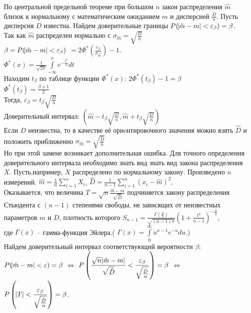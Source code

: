 \documentclass[russian, 12pt, fleqn,x11names]{article}
\begin{document}
По центральной предельной теореме при большом $n$ закон распределения $\hat{m}$ близок к нормальному с математическим ожиданием $m$ и дисперсией $\frac{D}{n}$. Пусть дисперсия $D$ известна. Найдем доверительные границы $P(\abs{\hat{m} - m} < \varepsilon_\beta) = \beta$. 
Так как $\hat{m}$ распределен нормально с $\sigma_{\hat{m}} = \sqrt{\frac{D}{n}}$\\
$\beta = P(\abs{\hat{m} - m} < \varepsilon_\beta)$
$ = 2\Phi^*(\frac{\varepsilon_\beta}{\sigma_{\hat{m}}}) - 1$.\\
$\Phi^*(x) = \frac{1}{\sqrt{2\pi}} \displaystyle{\int \limits _{-\infty} ^ {x}} e^{-\frac{t^2}{2}} dt$\\
Находим $t_\beta$ по таблице функции $\Phi^*(x)$: $2\Phi^*(t_\beta) - 1 = \beta$\\
$\Phi^*(t_\beta) = \frac{\beta + 1}{2}$\\
Тогда, $\varepsilon_\beta = t_{\beta} \sqrt{\frac{D}{n}}$\\
Доверительный интервал: $(\hat{m} - t_\beta \sqrt{\frac{D}{n}}, \hat{m} + t_\beta \sqrt{\frac{D}{n}})$\\
Если $D$ неизвестна, то в качестве её ориeнтировочного значения  можно взять $\hat{D}$ и положить приближенно $\sigma_{\hat{m}} = \sqrt{ \frac{\hat{D}}{n} }$\\
Но при этой замене возникает дополнительная ошибка. Для точного определения доверительного интервала необходимо знать вид знать вид закона распределения $X$.
Пусть,например, $X$ 
распределено по нормальному закону. Произведено $n$ измерений. $\hat{m} = \frac{1}{n} \displaystyle{\sum \limits_{i=1} ^ {n} } X_i$, $\hat{D} = \frac{1}{n - 1} \displaystyle{\sum \limits_{i=1} ^ {n} } (x_i - \hat{m})^2$.\\
Оказывается, что величина $T = \sqrt{n} \frac{\hat{m} - m}{\sqrt{\hat{D}}}$ подчиняется закону распределения Стьюдента с $(n-1)$ степенями свободы, не зависящих от неизвестных параметров $m$ и $D$, плотность которого $S_{n-1} = \frac{\Gamma(\frac{n}{2})}{\sqrt{(n-1)\pi}}(1 + \frac{t^2}{n - 1})^{-\frac{n}{2}}$, \\где $\Gamma (x)$ -- гамма-функция Эйлера.( $\Gamma (x) = \displaystyle{\int \limits_{0} ^ {\infty} } u^{x - 1} e ^{-u}du$.)\\
Найдем доверительный интервал соответствующий вероятности $\beta$: \\
$ P(\abs{\hat{m} - m} < \varepsilon) = \beta$ $\Leftrightarrow$ $\displaystyle { P\left (\frac{\sqrt{n} \abs{\hat{m} - m}}{\sqrt{\hat{D}}} < \frac{\varepsilon_\beta}{\sqrt{\frac{\hat{D}}{n}}}\right ) = \beta}$ $\Leftrightarrow$  $\displaystyle { P\left (\abs{T} < \frac{\varepsilon_\beta}{\sqrt{\frac{\hat{D}}{n}}} \right )}= \beta $.\\
\end{document}
